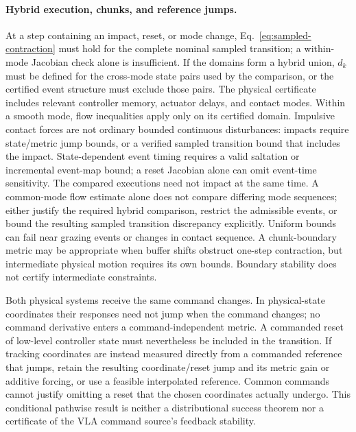 \paragraph{Hybrid execution, chunks, and reference jumps.}
At a step containing an impact, reset, or mode change,
Eq.~\eqref{eq:sampled-contraction} must hold for the complete nominal sampled
transition; a within-mode Jacobian check alone is insufficient.
If the domains form a hybrid union, $d_k$ must be defined for the cross-mode
state pairs used by the comparison, or the certified event structure must
exclude those pairs.
The physical certificate includes relevant controller memory, actuator
delays, and contact modes. Within a smooth mode, flow inequalities apply
only on its certified domain. Impulsive contact forces are not ordinary
bounded continuous disturbances: impacts require state/metric jump bounds,
or a verified sampled transition bound that includes the impact.
State-dependent event timing requires a valid saltation or incremental
event-map bound; a reset Jacobian alone can omit event-time sensitivity.
The compared executions need not impact at the same time. A common-mode
flow estimate alone does not compare differing mode sequences; either
justify the required hybrid comparison, restrict the admissible events,
or bound the resulting sampled transition discrepancy explicitly.
Uniform bounds can fail near grazing events or changes in contact sequence. A chunk-boundary metric may be appropriate
when buffer shifts obstruct one-step contraction, but intermediate physical
motion requires its own bounds. Boundary stability does not certify
intermediate constraints.

Both physical systems receive the same command changes. In physical-state
coordinates their responses need not jump when the command changes; no
command derivative enters a command-independent metric. A commanded reset
of low-level controller state must nevertheless be included in the
transition. If tracking coordinates are instead measured directly from a
commanded reference that jumps, retain the resulting coordinate/reset jump
and its metric gain or additive forcing, or use a feasible interpolated
reference. Common commands cannot justify omitting a reset that the chosen
coordinates actually undergo. This conditional pathwise result is neither
a distributional success theorem nor a certificate of the VLA command
source's feedback stability.

